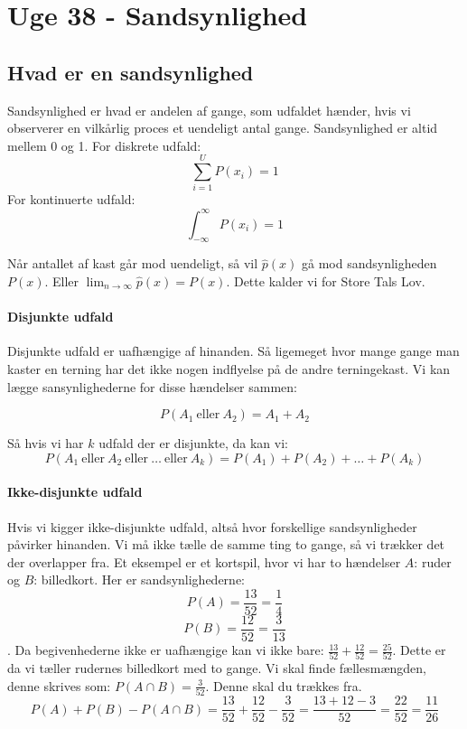 \documentclass{article}
\begin{document}
    \newpage
\section{Uge 38 - Sandsynlighed}
\subsection{Hvad er en sandsynlighed}
Sandsynlighed er hvad er andelen af gange, som udfaldet hænder, hvis vi
observerer en vilkårlig proces et uendeligt antal gange. Sandsynlighed  er altid
mellem 0 og 1. For diskrete udfald:
$$\sum^U_{i=1} P(x_i) = 1 $$
For kontinuerte udfald:
$$\int^{\infty}_{-\infty} P(x_i) = 1 $$

Når antallet af kast går mod uendeligt, så vil $\hat{p}(x)$ gå mod
sandsynligheden $P(x)$. Eller $\lim_{n\rightarrow \infty} \hat{p}(x) = P(x)$.
Dette kalder vi for Store Tals Lov. 

\paragraph{Disjunkte udfald}
Disjunkte udfald er uafhængige af hinanden. Så ligemeget hvor mange gange man
kaster en terning har det ikke nogen indflyelse på de andre terningekast. Vi kan
lægge sansynlighederne for disse hændelser sammen:

$$P(A_1 \ \text{eller} \ A_2) = A_1 + A_2$$

Så hvis vi har $k$ udfald der er disjunkte, da kan vi:
$$P(A_1 \ \text{eller} \ A_2 \ \text{eller} \ \dots \ \text{eller} \ A_k) = P(A_1) + P(A_2) + \dots + P(A_k)$$
\paragraph{Ikke-disjunkte udfald}
Hvis vi kigger ikke-disjunkte udfald, altså hvor forskellige sandsynligheder
påvirker hinanden. Vi må ikke tælle de samme ting to gange, så vi trækker det
der overlapper fra. Et eksempel er et kortspil, hvor vi har to hændelser $A$:
ruder og $B$: billedkort. Her er sandsynlighederne: $$P(A)=\frac{13}{52} =
\frac{1}{4}$$ $$P(B) = \frac{12}{52} = \frac{3}{13}$$. Da begivenhederne ikke er
uafhængige kan vi ikke bare: $\frac{13}{52} + \frac{12}{52} = \frac{25}{52}$.
Dette er da vi tæller rudernes billedkort med to gange. Vi skal finde
fællesmængden, denne skrives som: $P(A \cap B) = \frac{3}{52}$. Denne skal du
trækkes fra. 
$$P(A) + P(B) - P(A\cap B) = \frac{13}{52} + \frac{12}{52} - \frac{3}{52} =
\frac{13+12-3}{52}=\frac{22}{52} = \frac{11}{26}$$
\end{document}
